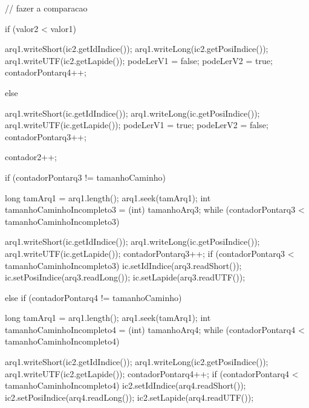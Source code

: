 {{{{{{                  }

                  // fazer a comparacao

                  if (valor2 < valor1) {

                    arq1.writeShort(ic2.getIdIndice());
                    arq1.writeLong(ic2.getPosiIndice());
                    arq1.writeUTF(ic2.getLapide());
                    podeLerV1 = false;
                    podeLerV2 = true;
                    contadorPontarq4++;

                  } else {
                    arq1.writeShort(ic.getIdIndice());
                    arq1.writeLong(ic.getPosiIndice());
                    arq1.writeUTF(ic.getLapide());
                    podeLerV1 = true;
                    podeLerV2 = false;
                    contadorPontarq3++;

                  }

                  contador2++;
                }

                if (contadorPontarq3 != tamanhoCaminho) {
                  long tamArq1 = arq1.length();
                  arq1.seek(tamArq1);
                  int tamanhoCaminhoIncompleto3 = (int) tamanhoArq3;
                  while (contadorPontarq3 < tamanhoCaminhoIncompleto3) {
                    arq1.writeShort(ic.getIdIndice());
                    arq1.writeLong(ic.getPosiIndice());
                    arq1.writeUTF(ic.getLapide());
                    contadorPontarq3++;
                    if (contadorPontarq3 < tamanhoCaminhoIncompleto3) {
                      ic.setIdIndice(arq3.readShort());
                      ic.setPosiIndice(arq3.readLong());
                      ic.setLapide(arq3.readUTF());
                    }

                  }

                } else if (contadorPontarq4 != tamanhoCaminho) {

                  long tamArq1 = arq1.length();
                  arq1.seek(tamArq1);
                  int tamanhoCaminhoIncompleto4 = (int) tamanhoArq4;
                  while (contadorPontarq4 < tamanhoCaminhoIncompleto4) {
                    arq1.writeShort(ic2.getIdIndice());
                    arq1.writeLong(ic2.getPosiIndice());
                    arq1.writeUTF(ic2.getLapide());
                    contadorPontarq4++;
                    if (contadorPontarq4 < tamanhoCaminhoIncompleto4) {
                      ic2.setIdIndice(arq4.readShort());
                      ic2.setPosiIndice(arq4.readLong());
                      ic2.setLapide(arq4.readUTF());
                    }

}}}}}}
